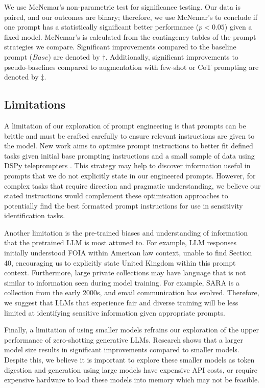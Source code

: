 We use McNemar’s non-parametric test \cite{mcnemar1947note} for significance testing. Our data is paired, and our outcomes are binary; therefore, we use McNemar’s to conclude if one prompt has a statistically significant better performance ($p < 0.05$) given a fixed model. McNemar’s is calculated from the contingency tables of the prompt strategies we compare. Significant improvements compared to the baseline prompt ($Base$) are denoted by $\dagger$. Additionally, significant improvements to pseudo-baselines compared to augmentation with few-shot or CoT prompting are denoted by $\ddagger$.

\subsection{Limitations}
A limitation of our exploration of prompt engineering is that prompts can be brittle and must be crafted carefully to ensure relevant instructions are given to the model. New work aims to optimise prompt instructions to better fit defined tasks given initial base prompting instructions and a small sample of data using DSPy teleprompters \cite{khattab2023dspy}. This strategy may help to discover information useful in prompts that we do not explicitly state in our engineered prompts. However, for complex tasks that require direction and pragmatic understanding, we believe our stated instructions would complement these optimisation approaches to potentially find the best formatted prompt instructions for use in sensitivity identification tasks.

Another limitation is the pre-trained biases and understanding of information that the pretrained LLM is most attuned to. For example, LLM responses initially understood FOIA within American law context, unable to find Section 40, encouraging us to explicitly state United Kingdom within this prompt context. Furthermore, large private collections may have language that is not similar to information seen during model training. For example, SARA is a collection from the early 2000s, and email communication has evolved. Therefore, we suggest that LLMs that experience fair and diverse training will be less limited at identifying sensitive information given appropriate prompts.

Finally, a limitation of using smaller models refrains our exploration of the upper performance of zero-shotting generative LLMs. Research shows that a larger model size results in significant improvements compared to smaller models. Despite this, we believe it is important to explore these smaller models as token digestion and generation using large models have expensive API costs, or require expensive hardware to load these models into memory which may not be feasible.

